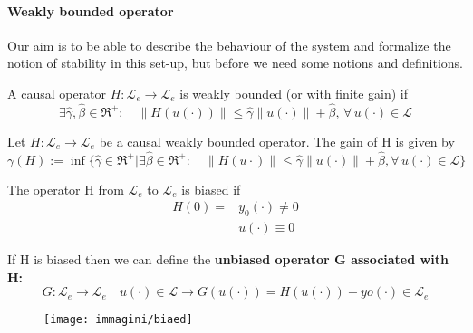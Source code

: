\paragraph{Weakly bounded operator}
Our aim is to be able to describe the behaviour of the system and formalize  the notion of stability in this set-up, but before we need some notions and definitions.
\begin{defn}
	A causal operator $H:\mathcal{L}_e\to\mathcal{L}_e$ is weakly bounded (or with finite gain) if \[
	\exists \hat{\gamma},\hat{\beta}\in\Re^+:\quad \|H(u(\cdot))\|\le\hat{\gamma}\|u(\cdot)\|+\hat{\beta},\,\forall\, u(\cdot)\in \mathcal{L}
	\]
\end{defn}
\begin{defn}
	Let $H:\mathcal{L}_e\to\mathcal{L}_e$ be a causal weakly bounded operator. The gain of H is given by
	\[\gamma(H):=\inf\{\hat{\gamma}\in\Re^+|\exists\hat{\beta}\in\Re^+:\quad\|H(u\cdot)\|\le\hat{\gamma}\|u(\cdot)\|+\hat{\beta},\forall \, u(\cdot)\in \mathcal{L}\}\]
\end{defn}
\begin{defn}
	The operator H from $\mathcal{L}_e$ to $\mathcal{L}_e$ is biased if
	\[
	\begin{aligned}
		H(0)=&y_0(\cdot)\neq0\\
		&u(\cdot)\equiv0
	\end{aligned}
	\]
\end{defn}
If H is biased then we can define the \textbf{unbiased operator G associated with H:}\[
G:\mathcal{L}_e\to\mathcal{L}_e\quad u(\cdot)\in\mathcal{L}\to G(u(\cdot))=H(u(\cdot))-yo(\cdot)\in \mathcal{L}_e
\]
\begin{figure}[H]
	\centering
	\texttt{[image: immagini/biaed]}
	\caption{}
	\label{fig:biaed}
\end{figure}
